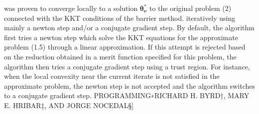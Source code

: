 \documentclass[unknownkeysallowed]{beamer}
\newcommand{\wh}{\widehat}
\newcommand{\bs}{ \boldsymbol}
\begin{document}
was proven to converge locally to a solution $\bs{\theta}_{\bs{\nu}}^*$ to the
original problem (2) 
connected with the KKT conditions of the barrier method.
iteratively using mainly a newton step and/or a conjugate gradient step. By
default, the algorithm first tries a newton step which solve the KKT equations
for the approximate problem (1.5) through a linear approximation. If this
attempt is rejected based on the reduction obtained in a merit function
specified for this problem, the algorithm then tries a conjugate gradient step
using a trust region. For instance, when the local convexity near the current
iterate is not satisfied in the approximate problem, the newton step is not
accepted and the algorithm switches to a conjugate gradient step.
PROGRAMMING∗RICHARD H. BYRD†, MARY E. HRIBAR‡, AND JORGE NOCEDAL§]\\
\end{document}
